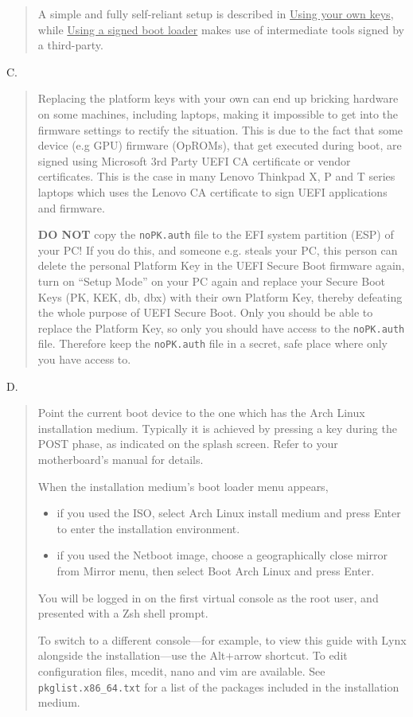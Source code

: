 \documentclass{exam-zh}
\begin{document}
\begin{question}
\begin{quote}
    A simple and fully self-reliant setup is described in \underline{Using your own keys}, while \allowbreak \underline{Using a signed boot loader} makes use of intermediate tools signed by a third-party.
  \end{quote}

  C.
  \begin{quote}
    Replacing the platform keys with your own can end up bricking hardware on some machines, including laptops, making it impossible to get into the firmware settings to rectify the situation. This is due to the fact that some device (e.g GPU) firmware (OpROMs), that get executed during boot, are signed using Microsoft 3rd Party UEFI CA certificate or vendor certificates. This is the case in many Lenovo Thinkpad X, P and T series laptops which uses the Lenovo CA certificate to sign UEFI applications and firmware.

    \textbf{DO NOT} copy the \texttt{noPK.auth} file to the EFI system partition (ESP) of your PC! If you do this, and someone e.g. steals your PC, this person can delete the personal Platform Key in the UEFI Secure Boot firmware again, turn on ``Setup Mode'' on your PC again and replace your Secure Boot Keys (PK, KEK, db, dbx) with their own Platform Key, thereby defeating the whole purpose of UEFI Secure Boot. Only you should be able to replace the Platform Key, so only you should have access to the \texttt{noPK.auth} file. Therefore keep the \texttt{noPK.auth} file in a secret, safe place where only you have access to.
  \end{quote}

  D.
  \begin{quote}
    Point the current boot device to the one which has the Arch Linux installation medium. Typically it is achieved by pressing a key during the POST phase, as indicated on the splash screen. Refer to your motherboard's manual for details.

    When the installation medium's boot loader menu appears,

    \begin{itemize}
      \item if you used the ISO, select Arch Linux install medium and press Enter to enter the installation environment.

      \item if you used the Netboot image, choose a geographically close mirror from Mirror menu, then select Boot Arch Linux and press Enter.
    \end{itemize}

    You will be logged in on the first virtual console as the root user, and presented with a Zsh shell prompt.

    To switch to a different console—for example, to view this guide with Lynx alongside the installation—use the Alt+arrow shortcut. To edit configuration files, mcedit, nano and vim are available. See \texttt{pkglist.x86\_64.txt} for a list of the packages included in the installation medium.
  \end{quote}
\end{question}
\end{document}
